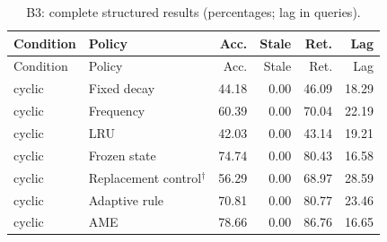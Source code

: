 \begin{longtable}{llrrrr}\caption{B3: complete structured results (percentages; lag in queries).}\label{tab:B3}\\\toprule Condition & Policy & Acc. & Stale & Ret. & Lag\\\midrule\endfirsthead\toprule Condition & Policy & Acc. & Stale & Ret. & Lag\\\midrule\endhead
cyclic & Fixed decay & 44.18 & 0.00 & 46.09 & 18.29\\
cyclic & Frequency & 60.39 & 0.00 & 70.04 & 22.19\\
cyclic & LRU & 42.03 & 0.00 & 43.14 & 19.21\\
cyclic & Frozen state & 74.74 & 0.00 & 80.43 & 16.58\\
cyclic & Replacement control$^{\dagger}$ & 56.29 & 0.00 & 68.97 & 28.59\\
cyclic & Adaptive rule & 70.81 & 0.00 & 80.77 & 23.46\\
cyclic & AME & 78.66 & 0.00 & 86.76 & 16.65\\
\bottomrule\end{longtable}